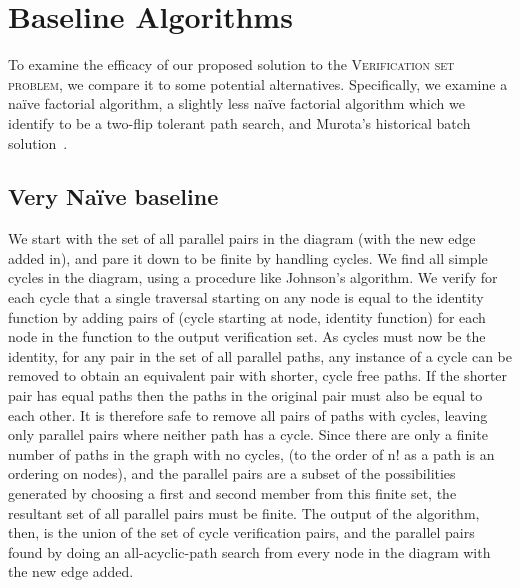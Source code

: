 \documentclass[sigplan,review,anonymous]{acmart}
\begin{document}
\section{Baseline Algorithms}

To examine the efficacy of our proposed solution to the \textsc{Verification set problem}, we compare it to some potential alternatives.
Specifically, we examine a na\"{i}ve factorial algorithm, a slightly less na\"{i}ve factorial algorithm which we identify to be a two-flip tolerant path search, and Murota's historical batch solution~\cite{commutative}.

\subsection{Very Na\"{i}ve baseline}

We start with the set of all parallel pairs in the diagram (with the new edge added in), and pare it down to be finite by handling cycles.
We find all simple cycles in the diagram, using a procedure like Johnson's algorithm. 
We verify for each cycle that a single traversal starting on any node is equal to the identity function by adding pairs of (cycle starting at node, identity function) for each node in the function to the output verification set.
As cycles must now be the identity, for any pair in the set of all parallel paths, any instance of a cycle can be removed to obtain an equivalent pair with shorter, cycle free paths.
If the shorter pair has equal paths then the paths in the original pair must also be equal to each other.
It is therefore safe to remove all pairs of paths with cycles, leaving only parallel pairs where neither path has a cycle.
Since there are only a finite number of paths in the graph with no cycles, (to the order of n! as a path is an ordering on nodes), and the parallel pairs are a subset of the possibilities generated by choosing a first and second member from this finite set, the resultant set of all parallel pairs must be finite.
The output of the algorithm, then, is the union of the set of cycle verification pairs, and the parallel pairs found by doing an all-acyclic-path search from every node in the diagram with the new edge added.
\end{document}
